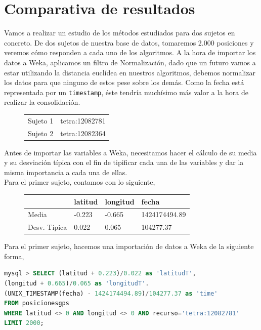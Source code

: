 \documentclass[a4paper, 12pt]{article}
\begin{document}
\pagebreak
\section{Comparativa de resultados}

Vamos a realizar un estudio de los m\'etodos estudiados para dos sujetos en concreto. De dos sujetos de nuestra base de datos, tomaremos 2.000 posiciones y veremos c\'omo responden a cada uno de los algoritmos. A la hora de importar los datos a Weka, aplicamos un filtro de Normalizaci\'on, dado que un futuro vamos a estar utilizando la distancia eucl\'idea en nuestros algoritmos, debemos normalizar los datos para que ninguno de estos pese sobre los dem\'as. Como la fecha est\'a representada por un \texttt{timestamp}, \'este tendr\'ia much\'isimo m\'as valor a la hora de realizar la consolidaci\'on.

\begin{figure}[H]
	\begin{tabular}{| l | l |}
	\hline
		Sujeto 1 & tetra:12082781 \\
		Sujeto 2 & tetra:12082364 \\	
	\hline
	\end{tabular}
\end{figure}

Antes de importar las variables a Weka, necesitamos hacer el c\'alculo de su media y su desviaci\'on t\'ipica con el fin de tipificar cada una de las variables y dar la misma importancia a cada una de ellas. \\

Para el primer sujeto, contamos con lo siguiente,\\

\begin{figure}[H]
	\begin{tabular}{| l | l | l | l |}
	\hline
	\rowcolor{LightCyan}
	\hline
  		& latitud & longitud & fecha \\
	\hline
		Media & -0.223 & -0.665 & 1424174494.89 \\
		Desv. T\'ipica & 0.022 & 0.065	& 104277.37 \\
	\hline
	\end{tabular}
\end{figure}

Para el primer sujeto, hacemos una importaci\'on de datos a Weka de la siguiente forma,\\

\begin{lstlisting}[language=sql, columns=fullflexible, basicstyle=\small, frame=tblr]
mysql > SELECT (latitud + 0.223)/0.022 as 'latitudT', 
(longitud + 0.665)/0.065 as 'longitudT'.
(UNIX_TIMESTAMP(fecha) - 1424174494.89)/104277.37 as 'time'
FROM posicionesgps
WHERE latitud <> 0 AND longitud <> 0 AND recurso='tetra:12082781'
LIMIT 2000;
\end{lstlisting}
\end{document}
